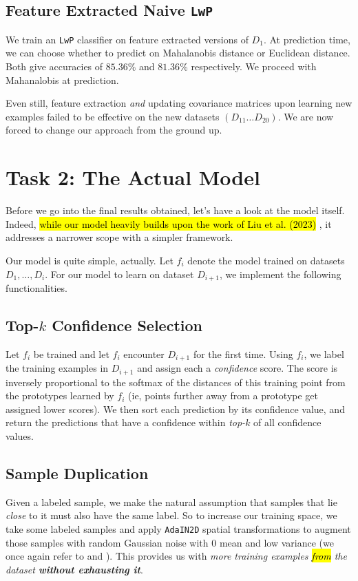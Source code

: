 \documentclass{article} %
\begin{document}
\subsection{Feature Extracted Naive \texttt{LwP}}
We train an \texttt{LwP} classifier on feature extracted versions of $D_1$. At prediction time, we can choose whether to predict on Mahalanobis distance or Euclidean distance. Both give accuracies of $85.36 \%$ and $81.36 \%$ respectively. We proceed with Mahanalobis at prediction.

Even still, feature extraction \textit{and} updating covariance matrices upon learning new examples failed to be effective on the new datasets $(D_{11} \dots D_{20})$. We are now forced to change our approach from the ground up.

\section{Task 2: The Actual Model}
Before we go into the final results obtained, let's have a look at the model itself. Indeed, \hl{while our model heavily builds upon the work of Liu et al. (2023)} \cite{liu2023dejavu}, it addresses a narrower scope with a simpler framework.

Our model is quite simple, actually. Let $f_i$ denote the model trained on datasets $D_1, \dots, D_i$. For our model to learn on dataset $D_{i + 1}$, we implement the following functionalities.

\subsection{Top-$k$ Confidence Selection}\label{tkcs}
Let $f_i$ be trained and let $f_i$ encounter $D_{i + 1}$ for the first time. Using $f_i$, we label the training examples in $D_{i + 1}$ and assign each a \textit{confidence} score. The score is inversely proportional to the softmax of the distances of this training point from the prototypes learned by $f_i$ (ie, points further away from a prototype get assigned lower scores). We then sort each prediction by its confidence value, and return the predictions that have a confidence within \textit{top-$k$} of all confidence values.

\subsection{Sample Duplication}\label{sd}
Given a labeled sample, we make the natural assumption that samples that lie \textit{close} to it must also have the same label. So to increase our training space, we take some labeled samples and apply \texttt{AdaIN2D} spatial transformations to augment those samples with random Gaussian noise with $0$ mean and low variance (we once again refer to \cite{liu2023dejavu} and \cite{sonyresearch2024ratp}). This provides us with \textit{more training examples \hl{from} the dataset \textbf{without exhausting it}}.
\end{document}
